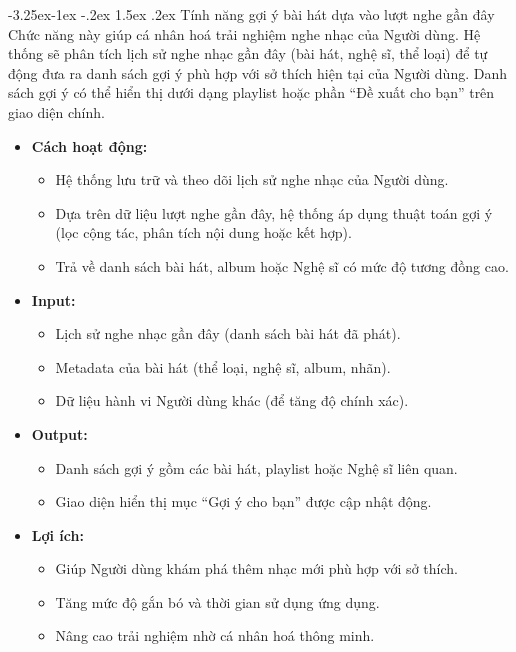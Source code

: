 \documentclass[a4paper]{article}
\makeatletter
\newcommand{\cach}{\hspace*{1.5em}\ignorespaces}
\newcounter {subsubsubsection}[subsubsection]
\newcommand\subsubsubsection{\@startsection{subsubsubsection}{4}{\z@}%
                                     {-3.25ex\@plus -1ex \@minus -.2ex}%
                                     {1.5ex \@plus .2ex}%
                                     {\normalfont\normalsize\bfseries}}
\makeatother
\begin{document}
\subsubsubsection{Tính năng gợi ý bài hát dựa vào lượt nghe gần đây}
\cach Chức năng này giúp cá nhân hoá trải nghiệm nghe nhạc của Người dùng.
Hệ thống sẽ phân tích lịch sử nghe nhạc gần đây (bài hát, nghệ sĩ, thể loại) để tự động đưa ra danh sách gợi ý phù hợp với sở thích hiện tại của Người dùng.
Danh sách gợi ý có thể hiển thị dưới dạng playlist hoặc phần “Đề xuất cho bạn” trên giao diện chính.
\begin{itemize}
	\item \textbf{Cách hoạt động:}
	      \begin{itemize}
		      \item Hệ thống lưu trữ và theo dõi lịch sử nghe nhạc của Người dùng.
		      \item Dựa trên dữ liệu lượt nghe gần đây, hệ thống áp dụng thuật toán gợi ý (lọc cộng tác, phân tích nội dung hoặc kết hợp).
		      \item Trả về danh sách bài hát, album hoặc Nghệ sĩ có mức độ tương đồng cao.
	      \end{itemize}

	\item \textbf{Input:}
	      \begin{itemize}
		      \item Lịch sử nghe nhạc gần đây (danh sách bài hát đã phát).
		      \item Metadata của bài hát (thể loại, nghệ sĩ, album, nhãn).
		      \item Dữ liệu hành vi Người dùng khác (để tăng độ chính xác).
	      \end{itemize}

	\item \textbf{Output:}
	      \begin{itemize}
		      \item Danh sách gợi ý gồm các bài hát, playlist hoặc Nghệ sĩ liên quan.
		      \item Giao diện hiển thị mục “Gợi ý cho bạn” được cập nhật động.
	      \end{itemize}

	\item \textbf{Lợi ích:}
	      \begin{itemize}
		      \item Giúp Người dùng khám phá thêm nhạc mới phù hợp với sở thích.
		      \item Tăng mức độ gắn bó và thời gian sử dụng ứng dụng.
		      \item Nâng cao trải nghiệm nhờ cá nhân hoá thông minh.
	      \end{itemize}
\end{itemize}
\end{document}
